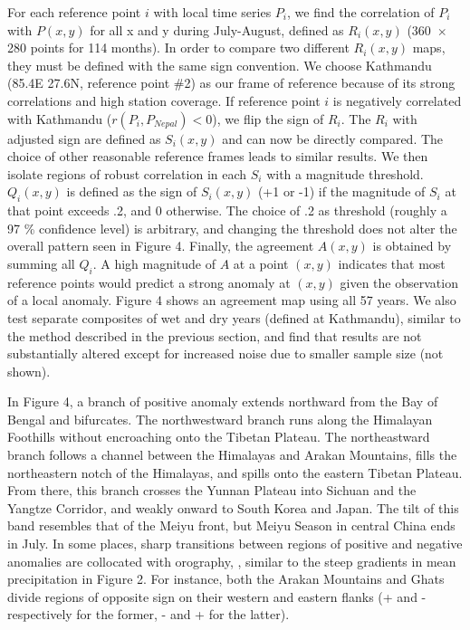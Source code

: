 \documentclass[12pt]{article}
\begin{document}
	For each reference point $i$ with local time series $P_i$, we find the correlation of $P_i$ with $P(x,y)$ for all x and y during July-August, defined as $R_i(x,y)$ (360\ $\times$ 280 points for 114 months). In order to compare two different $R_i(x,y)$ maps, they must be defined with the same sign convention. We choose Kathmandu (85.4\textdegree E 27.6\textdegree N, reference point \#2) as our frame of reference because of its strong correlations and high station coverage. If reference point $i$ is negatively correlated with Kathmandu ($r(P_i,P_{Nepal})<0$), we flip the sign of $R_i$. The $R_i$ with adjusted sign are defined as $S_i(x,y)$ and can now be directly compared. The choice of other reasonable reference frames leads to similar results. We then isolate regions of robust correlation in each $S_i$ with a magnitude threshold. $Q_i(x,y)$ is defined as the sign of $S_i(x,y)$ (+1 or -1) if the magnitude of $S_i$ at that point exceeds .2, and 0 otherwise. The choice of .2 as threshold (roughly a 97 \% confidence level) is arbitrary, and changing the threshold does not alter the overall pattern seen in Figure 4. Finally, the agreement $A(x,y)$ is obtained by summing all $Q_i$. A high magnitude of $A$ at a point $(x,y)$ indicates that most reference points would predict a strong anomaly at $(x,y)$ given the observation of a local anomaly. Figure 4 shows an agreement map using all 57 years. We also test separate composites of wet and dry years (defined at Kathmandu), similar to the method described in the previous section, and find that results are not substantially altered except for increased noise due to smaller sample size (not shown).
		
	In Figure 4, a branch of positive anomaly extends northward from the Bay of Bengal and bifurcates. The northwestward branch runs along the Himalayan Foothills without encroaching onto the Tibetan Plateau. The northeastward branch follows a channel between the Himalayas and Arakan Mountains, fills the northeastern notch of the Himalayas, and spills onto the eastern Tibetan Plateau. From there, this branch crosses the Yunnan Plateau into Sichuan and the Yangtze Corridor, and weakly onward to South Korea and Japan. The tilt of this band resembles that of the Meiyu front, but Meiyu Season in central China ends in July. In some places, sharp transitions between regions of positive and negative anomalies are collocated with orography, , similar to the steep gradients in mean precipitation in Figure 2. For instance, both the Arakan Mountains and Ghats divide regions of opposite sign on their western and eastern flanks (+ and - respectively for the former, - and + for the latter).
	
\end{document}
